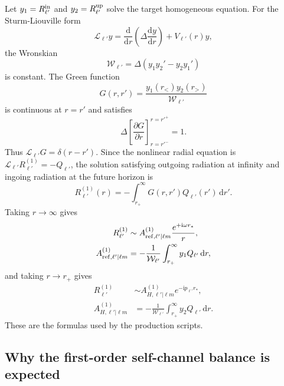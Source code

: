\documentclass[aps,prd,twocolumn,nofootinbib,superscriptaddress,10pt,floatfix]{revtex4-2}
\newcommand{\ii}{\mathrm{i}}
\newcommand{\dd}{\mathrm{d}}
\newcommand{\rp}{r_+}
\newcommand{\W}{\mathcal{W}}
\begin{document}
Let $y_1=R_{\ell'}^{\rm in}$ and $y_2=R_{\ell'}^{\rm up}$ solve the target
homogeneous equation.  For the Sturm-Liouville form
\begin{equation}
\mathcal{L}_{\ell'}y
=
\frac{\dd}{\dd r}\left(\Delta\frac{\dd y}{\dd r}\right)
+V_{\ell'}(r)y,
\end{equation}
the Wronskian
\begin{equation}
\W_{\ell'}=\Delta(y_1y_2'-y_2y_1')
\end{equation}
is constant.  The Green function
\begin{equation}
G(r,r')
=
\frac{y_1(r_<)y_2(r_>)}{\W_{\ell'}}
\end{equation}
is continuous at $r=r'$ and satisfies
\begin{equation}
\Delta\left[
\frac{\partial G}{\partial r}
\right]_{r=r'^{-}}^{r=r'^{+}}
=1.
\end{equation}
Thus $\mathcal{L}_{\ell'}G=\delta(r-r')$.  Since the nonlinear radial equation
is $\mathcal{L}_{\ell'}R_{\ell'}^{(1)}=-Q_{\ell'}$, the solution satisfying
outgoing radiation at infinity and ingoing radiation at the future horizon is
\begin{equation}
R_{\ell'}^{(1)}(r)
=
-\int_{\rp}^{\infty}G(r,r')Q_{\ell'}(r')\,\dd r'.
\end{equation}
Taking $r\rightarrow\infty$ gives
\begin{align}
R_{\ell'}^{(1)}
&\sim
A_{{\rm ref},\ell'|\ell m}^{(1)}
\frac{e^{+\ii\omega r_*}}{r},
\\
A_{{\rm ref},\ell'|\ell m}^{(1)}
&=
-\frac{1}{\W_{\ell'}}
\int_{\rp}^{\infty}y_1Q_{\ell'}\,\dd r,
\end{align}
and taking $r\rightarrow\rp$ gives
\begin{align}
R_{\ell'}^{(1)}
&\sim
A_{H,\ell'|\ell m}^{(1)}e^{-\ii p_{\ell'}r_*},
\\
A_{H,\ell'|\ell m}^{(1)}
&=
-\frac{1}{\W_{\ell'}}
\int_{\rp}^{\infty}y_2Q_{\ell'}\,\dd r.
\end{align}
These are the formulas used by the production scripts.

\subsection{Why the first-order self-channel balance is expected}
\end{document}
